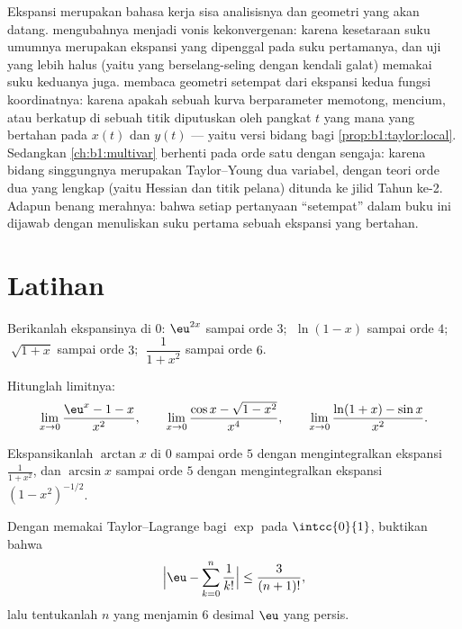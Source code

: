 \begin{remark}
Ekspansi merupakan bahasa kerja sisa analisisnya
dan geometri yang akan datang.  mengubahnya
menjadi vonis kekonvergenan: karena kesetaraan suku umumnya merupakan
ekspansi yang dipenggal pada suku pertamanya, dan uji yang lebih halus
(yaitu yang berselang-seling dengan kendali galat) memakai suku keduanya juga.
 membaca geometri setempat dari ekspansi kedua
fungsi koordinatnya: karena apakah sebuah kurva berparameter memotong,
mencium, atau berkatup di sebuah titik diputuskan oleh pangkat $t$ yang mana yang
bertahan pada $x(t)$ dan $y(t)$ --- yaitu versi bidang bagi
\cref{prop:b1:taylor:local}. Sedangkan \cref{ch:b1:multivar} berhenti pada
orde satu dengan sengaja: karena bidang singgungnya merupakan 
Taylor--Young dua variabel, dengan teori orde dua yang lengkap
(yaitu Hessian dan titik pelana) ditunda ke jilid Tahun ke-2. Adapun
benang merahnya: bahwa setiap pertanyaan ``setempat'' dalam buku ini dijawab
dengan menuliskan suku pertama sebuah ekspansi yang bertahan.
\end{remark}

\section{Latihan}

\begin{exercise}[$\star$]\label{exo:b1:taylor:1}
Berikanlah ekspansinya di $0$: $\eu^{2x}$ sampai orde $3$;
$\;\ln(1 - x)$ sampai orde $4$; $\;\sqrt{1 + x}$ sampai orde $3$;
$\;\dfrac{1}{1 + x^2}$ sampai orde $6$.
\end{exercise}

\begin{exercise}[$\star$]\label{exo:b1:taylor:2}
Hitunglah limitnya:
\[
\lim_{x\to 0} \frac{\eu^x - 1 - x}{x^2},
\qquad
\lim_{x\to 0} \frac{\cos x - \sqrt{1 - x^2}}{x^4},
\qquad
\lim_{x\to 0} \frac{\ln(1+x) - \sin x}{x^2}.
\]
\end{exercise}

\begin{exercise}[$\star$]\label{exo:b1:taylor:3}
Ekspansikanlah $\arctan x$ di $0$ sampai orde $5$ dengan mengintegralkan ekspansi
$\frac{1}{1 + x^2}$, dan $\arcsin x$ sampai orde $5$ dengan mengintegralkan
ekspansi $(1 - x^2)^{-1/2}$.
\end{exercise}

\begin{exercise}[$\star$]\label{exo:b1:taylor:4}
Dengan memakai Taylor--Lagrange bagi $\exp$ pada $\intcc{0}{1}$, buktikan bahwa
\[
\Bigl| \eu - \sum_{k=0}^{n} \frac{1}{k!} \Bigr| \leq
\frac{3}{(n+1)!},
\]
lalu tentukanlah $n$ yang menjamin $6$ desimal $\eu$ yang persis.
\end{exercise}

